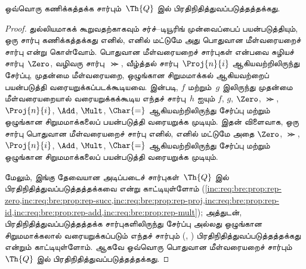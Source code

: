 \documentclass[../../../include/open-logic-section]{subfiles}
\begin{document}


\begin{thm}
ஒவ்வொரு கணிக்கத்தக்க சார்பும்~$\Th{Q}$ இல் பிரதிநிதித்துவப்படுத்தத்தக்கது.
\end{thm}

\begin{proof}
துல்லியமாகக் கூறுவதற்காகவும் சர்ச்--டியூரிங் முன்வைப்பைப் பயன்படுத்தியும்,
ஒரு சார்பு கணிக்கத்தக்கது எனில், எனில் மட்டுமே அது பொதுவான மீள்வரையறைச்
சார்பு என்று கொள்வோம். பொதுவான மீள்வரையறைச் சார்புகள் என்பவை சுழியச்
சார்பு~$\Zero$, வழிவரு சார்பு~$\Succ$, வீழ்த்தல் சார்பு~$\Proj{n}{i}$
ஆகியவற்றிலிருந்து சேர்ப்பு, முதன்மை மீள்வரையறை, ஒழுங்கான சிறுமமாக்கல்
ஆகியவற்றைப் பயன்படுத்தி வரையறுக்கப்படக்கூடியவை.
 இன்படி, $f$ மற்றும்~$g$ இலிருந்து முதன்மை
மீள்வரையறையால் வரையறுக்கக்கூடிய எந்தச் சார்பு~$h$ ஐயும் $f$, $g$,
$\Zero$, $\Succ$, $\Proj{n}{i}$, $\Add$, $\Mult$, $\Char{=}$ ஆகியவற்றிலிருந்து
சேர்ப்பு மற்றும் ஒழுங்கான சிறுமமாக்கலைப் பயன்படுத்தி வரையறுக்க முடியும்.
இதன் விளைவாக, ஒரு சார்பு பொதுவான மீள்வரையறைச் சார்பு எனில், எனில் மட்டுமே
அதை $\Zero$, $\Succ$, $\Proj{n}{i}$, $\Add$, $\Mult$, $\Char{=}$
ஆகியவற்றிலிருந்து சேர்ப்பு மற்றும் ஒழுங்கான சிறுமமாக்கலைப் பயன்படுத்தி
வரையறுக்க முடியும்.

மேலும், இங்கு தேவையான அடிப்படைச் சார்புகள்~$\Th{Q}$ இல்
பிரதிநிதித்துவப்படுத்தத்தக்கவை என்று காட்டியுள்ளோம்
(\cref{inc:req:bre:prop:rep-zero,inc:req:bre:prop:rep-succ,inc:req:bre:prop:rep-proj,inc:req:bre:prop:rep-id,inc:req:bre:prop:rep-add,inc:req:bre:prop:rep-mult});
அத்துடன், பிரதிநிதித்துவப்படுத்தத்தக்க சார்புகளிலிருந்து சேர்ப்பு அல்லது
ஒழுங்கான சிறுமமாக்கலால் வரையறுக்கப்படும் எந்தச் சார்பும்
(,
) பிரதிநிதித்துவப்படுத்தத்தக்கது என்றும்
காட்டியுள்ளோம். ஆகவே ஒவ்வொரு பொதுவான மீள்வரையறைச் சார்பும்~$\Th{Q}$ இல்
பிரதிநிதித்துவப்படுத்தத்தக்கது.
\end{proof}
\end{document}
